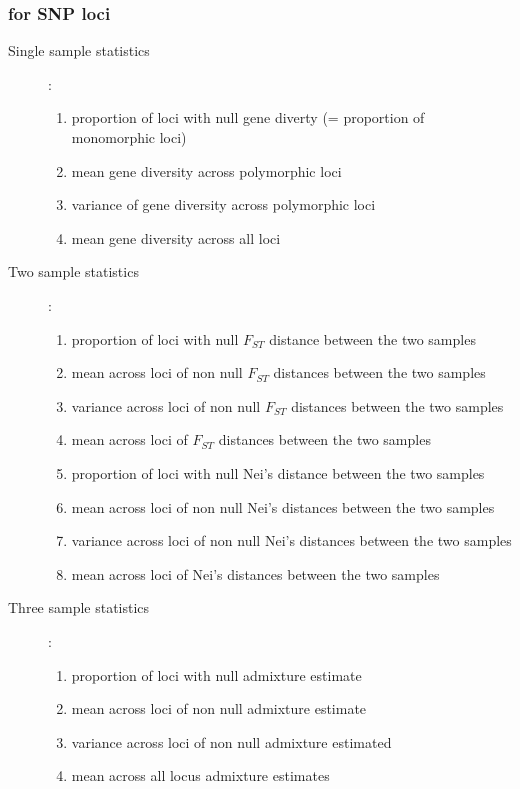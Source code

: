\subsubsection{for SNP loci}
\begin{description}
\item[Single sample statistics] : 
\begin{enumerate}
  \item proportion of loci with null gene diverty (= proportion of monomorphic loci) 
  \item mean gene diversity across polymorphic loci \citep{N1987}
  \item variance of gene diversity across polymorphic loci 
  \item mean gene diversity across all loci
 \end{enumerate}
\item[Two sample statistics] :
\begin{enumerate}
  \item proportion of loci with null $F_{ST}$ distance between the two samples \citep{WC1984}
  \item mean across loci of non null $F_{ST}$ distances between the two samples 
  \item variance across loci of non null $F_{ST}$ distances between the two samples
  \item mean across loci of $F_{ST}$ distances between the two samples
  \item proportion of loci with null Nei's distance between the two samples \citep{N1972}
  \item mean across loci of non null Nei's distances between the two samples 
  \item variance across loci of non null Nei's distances between the two samples
  \item mean across loci of Nei's distances between the two samples
  \end{enumerate}
\item[Three sample statistics] :
\begin{enumerate}
  \item proportion of loci with null admixture estimate
  \item mean across loci of non null admixture estimate
  \item variance across loci of non null admixture estimated
  \item mean across all locus admixture estimates
\end{enumerate}
\end{description}

